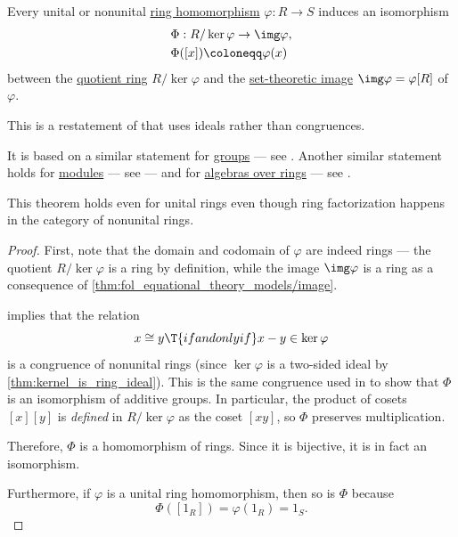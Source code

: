 \begin{theorem}\label{thm:homomorphism_theorem_for_rings}
  Every unital or nonunital \hyperref[def:ring/morphism]{ring homomorphism} \( {\varphi: R \to S} \) induces an isomorphism
  \begin{equation*}
    \begin{aligned}
      &\Phi: R / \ker \varphi \to \img \varphi, \\
      &\Phi([x]) \coloneqq \varphi(x)
    \end{aligned}
  \end{equation*}
  between the \hyperref[def:ring/quotient]{quotient ring} \( R / \ker \varphi \) and the \hyperref[def:set_valued_map/image]{set-theoretic image} \( \img \varphi = \varphi[R] \) of \( \varphi \).
\end{theorem}
\begin{comments}
  \item This is a restatement of  that uses ideals rather than congruences.

  It is based on a similar statement for \hyperref[def:group]{groups} --- see . Another similar statement holds for \hyperref[def:module]{modules} --- see  --- and for \hyperref[def:algebra_over_ring]{algebras over rings} --- see .

  \item This theorem holds even for unital rings even though ring factorization happens in the category of nonunital rings.
\end{comments}
\begin{proof}
  First, note that the domain and codomain of \( \varphi \) are indeed rings --- the quotient \( R / \ker \varphi \) is a ring by definition, while the image \( \img \varphi \) is a ring as a consequence of \cref{thm:fol_equational_theory_models/image}.

   implies that the relation
  \begin{equation*}
    x \cong y \T{if and only if} x - y \in \ker \varphi
  \end{equation*}
  is a congruence of nonunital rings (since \( \ker \varphi \) is a two-sided ideal by \cref{thm:kernel_is_ring_ideal}). This is the same congruence used in  to show that \( \Phi \) is an isomorphism of additive groups. In particular, the product of cosets \( [x][y] \) is \emph{defined} in \( R / \ker \varphi \) as the coset \( [xy] \), so \( \Phi \) preserves multiplication.

  Therefore, \( \Phi \) is a homomorphism of rings. Since it is bijective, it is in fact an isomorphism.

  Furthermore, if \( \varphi \) is a unital ring homomorphism, then so is \( \Phi \) because
  \begin{equation*}
    \Phi([1_R]) = \varphi(1_R) = 1_S.
  \end{equation*}
\end{proof}

